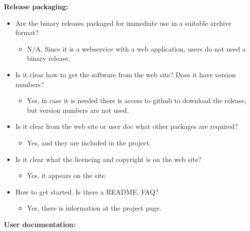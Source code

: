 \textbf{Release packaging:}

\begin{itemize}
\itemsep1pt\parskip0pt
\item
  Are the binary releases packaged for immediate use in a suitable
  archive format?

  \begin{itemize}
  \itemsep1pt\parskip0pt
  \item
    N/A. Since it is a webservice with a web application, users do not
    need a binary release.
  \end{itemize}
\item
  Is it clear how to get the software from the web site? Does it have
  version numbers?

  \begin{itemize}
  \itemsep1pt\parskip0pt
  \item
    Yes, in case it is needed there is access to github to download the
    release, but version numbers are not used.
  \end{itemize}
\item
  Is it clear from the web site or user doc what other packages are
  required?

  \begin{itemize}
  \itemsep1pt\parskip0pt
  \item
    Yes, and they are included in the project.
  \end{itemize}
\item
  Is it clear what the licencing and copyright is on the web site?

  \begin{itemize}
  \itemsep1pt\parskip0pt
  \item
    Yes, it appears on the site.
  \end{itemize}
\item
  How to get started. Is there a README, FAQ?

  \begin{itemize}
  \itemsep1pt\parskip0pt
  \item
    Yes, there is information at the project page.
  \end{itemize}
\end{itemize}

\textbf{User documentation:}

